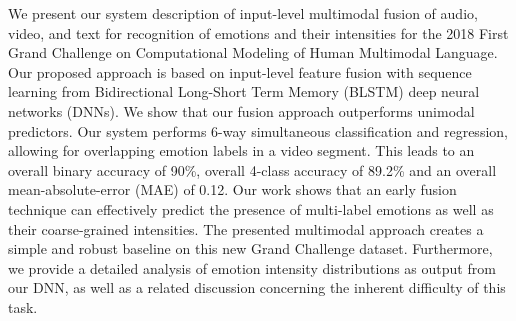 We present our system description of input-level multimodal fusion of audio, video, and text for recognition of emotions and their intensities for the 2018 First Grand Challenge on Computational Modeling of Human Multimodal Language. Our proposed approach is based on input-level feature fusion with sequence learning from Bidirectional Long-Short Term Memory (BLSTM) deep neural networks (DNNs). We show that our fusion approach outperforms unimodal predictors. Our system performs 6-way simultaneous classification and regression, allowing for overlapping emotion labels in a video segment. This leads to an overall binary accuracy of 90\%, overall 4-class accuracy of 89.2\% and an overall mean-absolute-error (MAE) of 0.12. Our work shows that an early fusion technique can effectively predict the presence of multi-label emotions as well as their coarse-grained intensities. The presented multimodal approach creates a simple and robust baseline on this new Grand Challenge dataset. Furthermore, we provide a detailed analysis of emotion intensity distributions as output from our DNN, as well as a related discussion concerning the inherent difficulty of this task.
